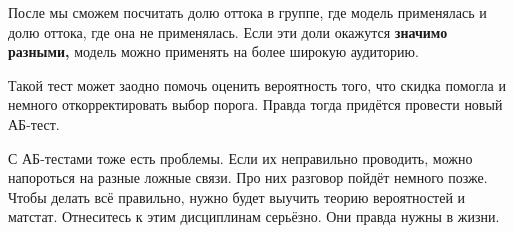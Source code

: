 \documentclass[12pt, a4paper, oneside]{article}
\theoremstyle{plain} %
\theoremstyle{definition}
\newcommand{\indef}[1]{\textbf{ \color{green} #1}}
\begin{document}
\begin{solution}
\begin{enumerate}
После мы сможем посчитать долю оттока в группе, где модель применялась и долю оттока, где она не применялась. Если эти доли окажутся \indef{значимо разными,} модель можно применять на более широкую аудиторию. 

Такой тест может заодно помочь оценить вероятность того, что скидка помогла и немного откорректировать выбор порога. Правда тогда придётся провести новый АБ-тест. 

С АБ-тестами тоже есть проблемы. Если их неправильно проводить, можно напороться на разные ложные связи. Про них разговор пойдёт немного позже. Чтобы делать всё правильно, нужно будет выучить теорию вероятностей и матстат. Отнеситесь к этим дисциплинам серьёзно. Они правда нужны в жизни.  
\end{enumerate} 
\end{solution}
\end{document}
